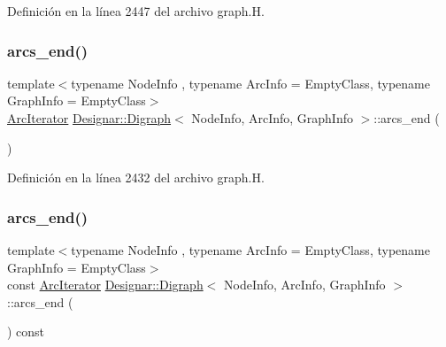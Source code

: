 Definición en la línea 2447 del archivo graph.\+H.

\mbox{\label{class_designar_1_1_digraph_af4e39baa2e8370cfda5f61f551b3091f}} 
\subsubsection{\texorpdfstring{arcs\+\_\+end()}{arcs\_end()}\hspace{0.1cm}{\footnotesize\ttfamily [1/4]}}
{\footnotesize\ttfamily template$<$typename Node\+Info , typename Arc\+Info  = Empty\+Class, typename Graph\+Info  = Empty\+Class$>$ \\
\hyperlink{class_designar_1_1_digraph_1_1_arc_iterator}{Arc\+Iterator} \hyperlink{class_designar_1_1_digraph}{Designar\+::\+Digraph}$<$ Node\+Info, Arc\+Info, Graph\+Info $>$\+::arcs\+\_\+end (\begin{DoxyParamCaption}{ }\end{DoxyParamCaption})\hspace{0.3cm}{\ttfamily [inline]}}



Definición en la línea 2432 del archivo graph.\+H.

\mbox{\label{class_designar_1_1_digraph_a128df54ce973f5b1f956407a7f565bc3}} 
\subsubsection{\texorpdfstring{arcs\+\_\+end()}{arcs\_end()}\hspace{0.1cm}{\footnotesize\ttfamily [2/4]}}
{\footnotesize\ttfamily template$<$typename Node\+Info , typename Arc\+Info  = Empty\+Class, typename Graph\+Info  = Empty\+Class$>$ \\
const \hyperlink{class_designar_1_1_digraph_1_1_arc_iterator}{Arc\+Iterator} \hyperlink{class_designar_1_1_digraph}{Designar\+::\+Digraph}$<$ Node\+Info, Arc\+Info, Graph\+Info $>$\+::arcs\+\_\+end (\begin{DoxyParamCaption}{ }\end{DoxyParamCaption}) const\hspace{0.3cm}{\ttfamily [inline]}}



